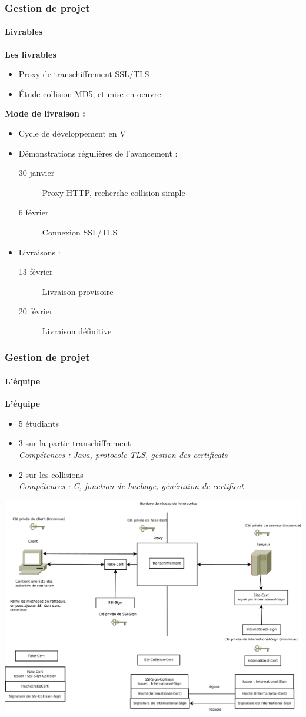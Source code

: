 \begin{frame}
\frametitle{Gestion de projet}
\framesubtitle{Livrables}
\textbf{Les livrables}
\begin{itemize}
\item Proxy de transchiffrement SSL/TLS
\item Étude collision MD5, et mise en oeuvre
\end{itemize}

\textbf{Mode de livraison :}
\begin{itemize}
\item Cycle de développement en V
\item Démonstrations régulières de l'avancement :
\begin{description}

\item[30 janvier] Proxy HTTP, recherche collision simple
\item[6 février] Connexion SSL/TLS
\end{description}

\item Livraisons :
\begin{description}
\item[13 février] Livraison provisoire
\item[20 février] Livraison définitive
\end{description}
\end{itemize}

\end{frame}



\begin{frame}
\frametitle{Gestion de projet}
\framesubtitle{L'équipe}
\textbf{L'équipe}
\begin{itemize}
\item 5 étudiants
\item 3 sur la partie transchiffrement\\ \textit{Compétences : Java, protocole TLS, gestion des certificats}
\item 2 sur les collisions\\
\textit{Compétences : C, fonction de hachage, génération de certificat}
\end{itemize}
\end{frame}


\begin{frame}
\includegraphics[width=\textwidth]{../STB/images/schema_autorites.pdf}

\end{frame}
